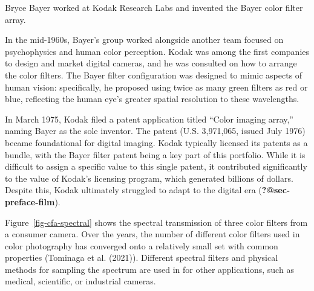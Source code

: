 \documentclass[
  letterpaper,
]{book}
\begin{document}
\begin{tcolorbox}[enhanced jigsaw, title=\textcolor{quarto-callout-note-color}{\faInfo}\hspace{0.5em}{Bayer pattern}, colback=white, colframe=quarto-callout-note-color-frame, leftrule=.75mm, breakable, arc=.35mm, toptitle=1mm, left=2mm, colbacktitle=quarto-callout-note-color!10!white, toprule=.15mm, bottomrule=.15mm, coltitle=black, bottomtitle=1mm, titlerule=0mm, rightrule=.15mm, opacitybacktitle=0.6, opacityback=0]

Bryce Bayer worked at Kodak Research Labs and invented the Bayer color
filter array.

In the mid-1960s, Bayer's group worked alongside another team focused on
psychophysics and human color perception. Kodak was among the first
companies to design and market digital cameras, and he was consulted on
how to arrange the color filters. The Bayer filter configuration was
designed to mimic aspects of human vision: specifically, he proposed
using twice as many green filters as red or blue, reflecting the human
eye's greater spatial resolution to these wavelengths.

In March 1975, Kodak filed a patent application titled ``Color imaging
array,'' naming Bayer as the sole inventor. The patent (U.S. 3,971,065,
issued July 1976) became foundational for digital imaging. Kodak
typically licensed its patents as a bundle, with the Bayer filter patent
being a key part of this portfolio. While it is difficult to assign a
specific value to this single patent, it contributed significantly to
the value of Kodak's licensing program, which generated billions of
dollars. Despite this, Kodak ultimately struggled to adapt to the
digital era (\textbf{?@sec-preface-film}).

\end{tcolorbox}

Figure~\ref{fig-cfa-spectral} shows the spectral transmission of three
color filters from a consumer camera. Over the years, the number of
different color filters used in color photography has converged onto a
relatively small set with common properties (Tominaga et al. (2021)).
Different spectral filters and physical methods for sampling the
spectrum are used in for other applications, such as medical,
scientific, or industrial cameras.
\end{document}
